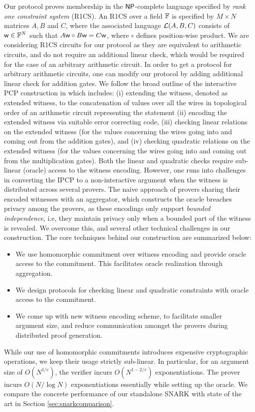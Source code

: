 Our protocol proves membership in the $\mathsf{NP}$-complete
language specified by {\em rank one constraint system} (R1CS). An R1CS over a
field $\mathbb{F}$ is specified by $M\times N$ matrices $A,B$ and $C$, where the
associated language $\mathcal{L}(A,B,C)$ consists of $\mathsf{w}\in \mathbb{F}^N$ such that
$A\mathsf{w}\circ B\mathsf{w}=C\mathsf{w}$, where $\circ$ defines position-wise product.  We are considering R1CS circuits for our protocol as they are equivalent to arithmetic circuits, and do not require an additional linear check, which would be required for the case of an arbitrary arithmetic circuit.  In order to get a protocol for arbitrary arithmetic circuits, one can modify our protocol by adding additional linear check for addition gates.  We follow the broad outline of the interactive PCP
construction in \cite{ligero} which includes: (i) extending the witness, denoted as extended witness, to the concatenation of values over all the wires in topological order of an arithmetic circuit  representing the statement   (ii) encoding the extended witness via suitable
error correcting code, (iii) checking linear relations on the extended witness (for the values concerning the wires going into and coming out from the addition gates), and
(iv) checking quadratic relations on
the extended witness  (for the values concerning the wires going into and coming out from the multiplication gates). Both the linear and quadratic checks require sub-linear (oracle) access to the 
witness encoding.
However, one runs into 
challenges in converting the IPCP to a non-interactive
argument when the witness is distributed across several provers. The naive
approach of provers sharing their encoded witnesses with an aggregator, which
constructs the oracle breaches privacy among the provers, as these encodings
only support {\em bounded independence}, i.e, they maintain privacy only when a
bounded part of the witness is revealed. We overcome this, and several other
technical challenges in our construction. The core techniques behind our
construction are summarized below:
\begin{itemize}
\item We use homomorphic commitment over witness encoding and provide oracle
access to the commitment. This facilitates oracle realization through
aggregation.
\item We design protocols for checking linear and quadratic constraints
with oracle access to the commitment.
\item We come up with new witness encoding scheme, to facilitate smaller
argument size, and reduce communication amongst the provers during distributed proof
generation.
\end{itemize}
While our use of homomorphic commitments introduces expensive cryptographic
operations, we keep their usage strictly sub-linear. In particular, for an
argument size of $O(N^{1/c})$, the verifier  incurs $O(N^{1-2/c})$
exponentiations. The prover incurs $O(N/\log N)$ exponentiations essentially while
setting up the oracle. We compare the concrete performance of our standalone SNARK with state of the art in Section
\ref{sec:snarkcomparison}.
